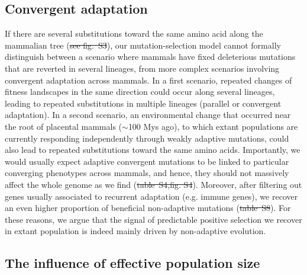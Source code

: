 \documentclass[10pt,letterpaper]{article}
\providecommand{\DIFaddtex}[1]{{\protect\color{blue}\uwave{#1}}} %
\providecommand{\DIFdeltex}[1]{{\protect\color{red}\sout{#1}}}                      %
\providecommand{\DIFaddbegin}{} %
\providecommand{\DIFaddend}{} %
\providecommand{\DIFdelbegin}{} %
\providecommand{\DIFdelend}{} %
\providecommand{\DIFadd}[1]{\texorpdfstring{\DIFaddtex{#1}}{#1}} %
\providecommand{\DIFdel}[1]{\texorpdfstring{\DIFdeltex{#1}}{}} %
\newcommand{\DIFscaledelfig}{0.5}
\newlength{\DIFdelgraphicswidth} %
\newlength{\DIFdelgraphicsheight} %
\newcommand{\DIFaddincludegraphics}[2][]{{\color{blue}\fbox{\DIFOincludegraphics[#1]{#2}}}} %
\newcommand{\DIFdelincludegraphics}[2][]{%
\sbox{\DIFdelgraphicsbox}{\DIFOincludegraphics[#1]{#2}}%
\settoboxwidth{\DIFdelgraphicswidth}{\DIFdelgraphicsbox} %
\settoboxtotalheight{\DIFdelgraphicsheight}{\DIFdelgraphicsbox} %
\scalebox{\DIFscaledelfig}{%
\parbox[b]{\DIFdelgraphicswidth}{\usebox{\DIFdelgraphicsbox}\\[-\baselineskip] \rule{\DIFdelgraphicswidth}{0em}}\llap{\resizebox{\DIFdelgraphicswidth}{\DIFdelgraphicsheight}{%
\setlength{\unitlength}{\DIFdelgraphicswidth}%
\begin{picture}(1,1)%
\thicklines\linethickness{2pt} %
{\color[rgb]{1,0,0}\put(0,0){\framebox(1,1){}}}%
{\color[rgb]{1,0,0}\put(0,0){\line( 1,1){1}}}%
{\color[rgb]{1,0,0}\put(0,1){\line(1,-1){1}}}%
\end{picture}%
}\hspace*{3pt}}} %
} %
\DeclareRobustCommand{\DIFaddbegin}{\DIFOaddbegin \let\includegraphics\DIFaddincludegraphics} %
\DeclareRobustCommand{\DIFaddend}{\DIFOaddend \let\includegraphics\DIFOincludegraphics} %
\DeclareRobustCommand{\DIFdelbegin}{\DIFOdelbegin \let\includegraphics\DIFdelincludegraphics} %
\DeclareRobustCommand{\DIFdelend}{\DIFOaddend \let\includegraphics\DIFOincludegraphics} %
\begin{document}
\subsection*{Convergent adaptation}

If there are several substitutions toward the same amino acid along the mammalian tree (\DIFdelbegin \DIFdel{see fig.~S3}\DIFdelend \DIFaddbegin {}\DIFaddend ), our mutation-selection model cannot formally distinguish between a scenario where mammals have fixed deleterious mutations that are reverted in several lineages, from more complex scenarios involving convergent adaptation across mammals.
In a first scenario, repeated changes of fitness landscapes in the same direction could occur along several lineages, leading to repeated substitutions in multiple lineages (parallel or convergent adaptation).
In a second scenario, an environmental change that occurred near the root of placental mammals ($\sim$100 Mys ago), to which extant populations are currently responding independently through weakly adaptive mutations, could also lead to repeated substitutions toward the same amino acids.
Importantly, we would usually expect adaptive convergent mutations to be linked to particular converging phenotypes across mammals, and hence, they should not massively affect the whole genome as we find (\DIFdelbegin \DIFdel{table~S4,fig. S4}\DIFdelend \DIFaddbegin {}\DIFadd{,~}\DIFaddend ).
Moreover, after filtering out genes usually associated to recurrent adaptation (e.g. immune genes), we recover an even higher proportion of beneficial non-adaptive mutations (\DIFdelbegin \DIFdel{table~S8}\DIFdelend \DIFaddbegin {}\DIFaddend ).
For these reasons, we argue that the signal of predictable positive selection we recover in extant population is indeed mainly driven by non-adaptive evolution.

\subsection*{The influence of effective population size}
\end{document}
